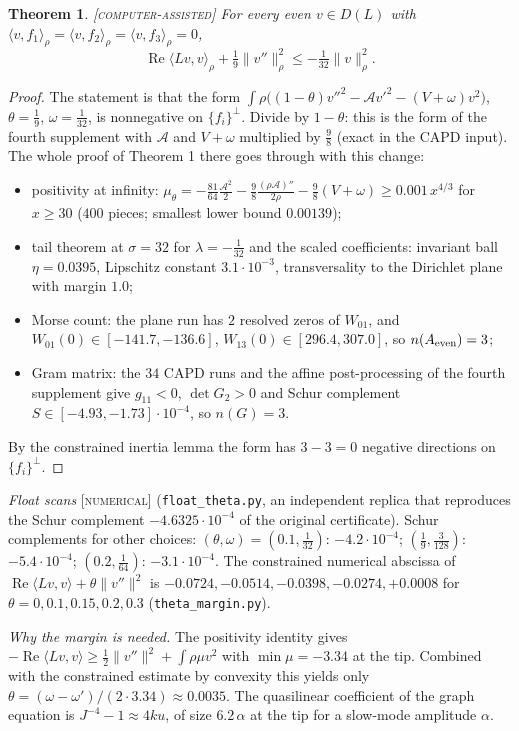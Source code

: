 \documentclass[11pt]{amsart}
\newtheorem{theorem}{Theorem}
\theoremstyle{remark}
\newcommand{\ip}[2]{\langle #1,#2\rangle}
\newcommand{\lab}[1]{\textup{\textsc{[#1]}}}
\providecommand{\re}{}\renewcommand{\re}{\operatorname{Re}}
\begin{document}
\begin{theorem}\label{thm:theta}\lab{computer-assisted}
For every even $v\in D(L)$ with $\ip{v}{f_1}_\rho=\ip{v}{f_2}_\rho=\ip{v}{f_3}_\rho=0$,
\[
\re\ip{Lv}{v}_\rho+\tfrac19\|v''\|_\rho^2\le-\tfrac1{32}\|v\|_\rho^2 .
\]
\end{theorem}
\begin{proof}
The statement is that the form $\int\rho\big((1-\theta)v''^2-\mathcal Av'^2-(V+\omega)v^2\big)$, $\theta=\frac19$, $\omega=\frac1{32}$, is nonnegative on $\{f_i\}^\perp$. Divide by $1-\theta$: this is the form of the fourth supplement with $\mathcal A$ and $V+\omega$ multiplied by $\frac98$ (exact in the CAPD input). The whole proof of Theorem 1 there goes through with this change:
\begin{itemize}
\item positivity at infinity: $\mu_\theta=-\frac{81}{64}\frac{\mathcal A^2}2-\frac98\frac{(\rho\mathcal A)''}{2\rho}-\frac98(V+\omega)\ge0.001\,x^{4/3}$ for $x\ge30$ ($400$ pieces; smallest lower bound $0.00139$);
\item tail theorem at $\sigma=32$ for $\lambda=-\frac1{32}$ and the scaled coefficients: invariant ball $\eta=0.0395$, Lipschitz constant $3.1\cdot10^{-3}$, transversality to the Dirichlet plane with margin $1.0$;
\item Morse count: the plane run has $2$ resolved zeros of $W_{01}$, and $W_{01}(0)\in[-141.7,-136.6]$, $W_{13}(0)\in[296.4,307.0]$, so $n(A_{\rm even})=3$;
\item Gram matrix: the $34$ CAPD runs and the affine post-processing of the fourth supplement give $g_{11}<0$, $\det G_2>0$ and Schur complement $S\in[-4.93,-1.73]\cdot10^{-4}$, so $n(G)=3$.
\end{itemize}
By the constrained inertia lemma the form has $3-3=0$ negative directions on $\{f_i\}^\perp$.
\end{proof}

\emph{Float scans} \lab{numerical} (\texttt{float\_theta.py}, an independent replica that reproduces the Schur complement $-4.6325\cdot10^{-4}$ of the original certificate). Schur complements for other choices: $(\theta,\omega)=(0.1,\frac1{32})$: $-4.2\cdot10^{-4}$; $(\frac19,\frac3{128})$: $-5.4\cdot10^{-4}$; $(0.2,\frac1{64})$: $-3.1\cdot10^{-4}$. The constrained numerical abscissa of $\re\ip{Lv}{v}+\theta\|v''\|^2$ is $-0.0724,-0.0514,-0.0398,-0.0274,+0.0008$ for $\theta=0,0.1,0.15,0.2,0.3$ (\texttt{theta\_margin.py}).

\emph{Why the margin is needed.} The positivity identity gives $-\re\ip{Lv}{v}\ge\frac12\|v''\|^2+\int\rho\mu v^2$ with $\min\mu=-3.34$ at the tip. Combined with the constrained estimate by convexity this yields only $\theta=(\omega-\omega')/(2\cdot3.34)\approx0.0035$. The quasilinear coefficient of the graph equation is $J^{-4}-1\approx4ku$, of size $6.2\,\alpha$ at the tip for a slow-mode amplitude $\alpha$.
\end{document}
